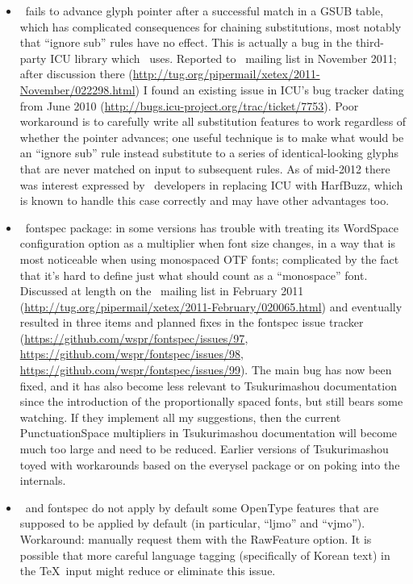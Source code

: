 \documentclass[14pt]{extarticle}
\begin{document}
\begin{itemize}
  \item \XeTeX\ fails to advance glyph pointer after a successful match in a
    GSUB table, which has complicated consequences for chaining
    substitutions, most notably that ``ignore sub'' rules have no effect.
    This is actually a bug in the third-party ICU library which \XeTeX\ uses.
    Reported to \XeTeX\ mailing list in November 2011; after discussion there
    (\url{http://tug.org/pipermail/xetex/2011-November/022298.html}) I found
    an existing issue in ICU's bug tracker dating from June 2010
    (\url{http://bugs.icu-project.org/trac/ticket/7753}).  Poor
    workaround is to carefully write all substitution features to work
    regardless of whether the pointer advances; one useful technique is to
    make what would be an ``ignore sub'' rule instead substitute to a
    series of identical-looking glyphs that are never matched on input to
    subsequent rules.  As of mid-2012 there was interest expressed by
    \XeTeX\ developers in replacing ICU with HarfBuzz, which is known to
    handle this case correctly and may have other advantages too.

  \item \XeTeX\ fontspec package: in some versions has trouble with treating
    its WordSpace configuration option as a multiplier when font size
    changes, in a way that is most noticeable when using monospaced OTF
    fonts; complicated by the fact that it's hard to define just what should
    count as a ``monospace'' font.  Discussed at length on the \XeTeX\ 
    mailing list in February 2011
    (\url{http://tug.org/pipermail/xetex/2011-February/020065.html}) and
    eventually resulted in three items and planned fixes in the fontspec issue
    tracker (\url{https://github.com/wspr/fontspec/issues/97},
    \url{https://github.com/wspr/fontspec/issues/98},
    \url{https://github.com/wspr/fontspec/issues/99}).  The main bug has now
    been fixed, and it has also become less relevant to Tsukurimashou
    documentation since the introduction of the proportionally spaced fonts,
    but still bears some watching.  If they implement all my suggestions,
    then the current PunctuationSpace multipliers in Tsukurimashou
    documentation will become much too large and need to be reduced.
    Earlier versions of Tsukurimashou toyed with workarounds based on the
    everysel package or on poking into the internals.

  \item \XeTeX\ and fontspec do not apply by default some OpenType features
    that are supposed to be applied by default (in particular, ``ljmo'' and
    ``vjmo'').  Workaround: manually request them with the RawFeature
    option.  It is possible that more careful language tagging (specifically
    of Korean text) in the \TeX\ input might reduce or eliminate this issue.


\end{itemize}
\end{document}
